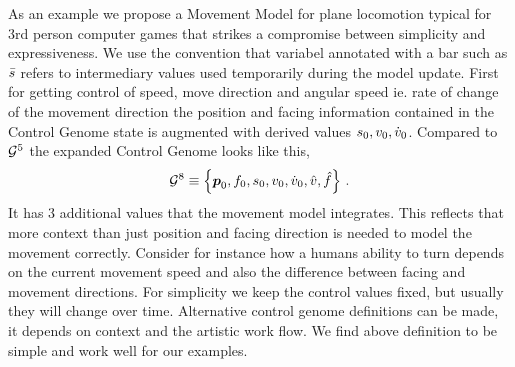 As an example we propose a Movement Model for plane locomotion typical for 3rd person computer games   that strikes a compromise between simplicity and expressiveness. We use the convention that variabel annotated with a bar such as $\bar{s}$ refers to intermediary values used temporarily during the model update. 
%
First for getting control of speed, move direction and angular speed ie. rate of change of the movement direction the position and facing information contained in the Control Genome state is augmented with derived values $s_0, v_0, {\dot{v}}_0$. 
%
Compared to $\mathcal{G}^{5}$ the expanded Control Genome looks like this,
\begin{subequations}
\begin{align}
    \mathcal{G}^{8} \equiv \left\{ \boldsymbol{p }_0,f_0,s_0,v_0,{\dot{v}}_0,\hat{v},\hat{f} \right\}\,.
\end{align}
\end{subequations}
It has 3 additional values that the movement model integrates. This reflects that more context than just position and facing direction is needed to model the movement correctly. Consider for instance how a humans ability to turn depends on the current movement speed and also the difference between facing and movement directions. For simplicity we keep the control values fixed, but usually they will change over time.
Alternative control genome definitions can be made, it depends on context and the artistic work flow. We find above definition to be simple and work well for our examples.

